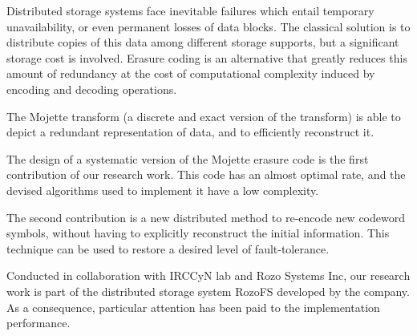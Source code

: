 
Distributed storage systems face inevitable failures which entail temporary
unavailability, or even permanent losses of data blocks. The classical solution
is to distribute copies of this data among different storage supports, but a
significant storage cost is involved.
%
Erasure coding is an alternative that greatly reduces this amount of redundancy
at the cost of computational complexity induced by encoding and decoding
operations.

The Mojette transform (a discrete and exact version of the \radon transform) is
able to depict a redundant representation of data, and to efficiently
reconstruct it.

The design of a systematic version of the Mojette erasure code is the first
contribution of our research work. This code has an almost optimal rate, and
the devised algorithms used to implement it have a low complexity.

The second contribution is a new distributed method to re-encode new codeword
symbols, without having to explicitly reconstruct the initial information. This
technique can be used to restore a desired level of fault-tolerance.

Conducted in collaboration with IRCCyN lab and Rozo Systems Inc, our research
work is part of the distributed storage system RozoFS developed by the
company. As a consequence, particular attention has been paid to the
implementation performance.


